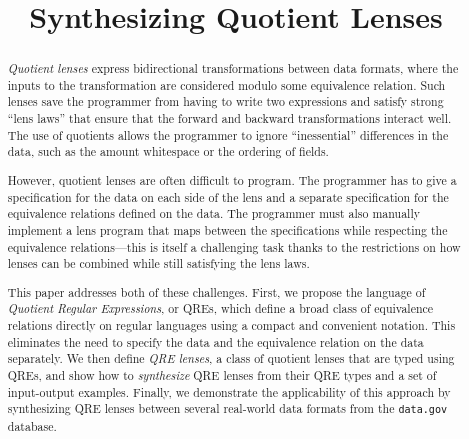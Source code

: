 \documentclass{svproc}
\begin{document}
\mainmatter              %
%
\title{Synthesizing Quotient Lenses}
%
%
\author{}
%
\authorrunning{} %
%
\tocauthor{}
%
\institute{}

\maketitle              %

\begin{abstract} 

  {\em Quotient lenses} express bidirectional transformations between data
  formats, where the inputs to the transformation are considered modulo some
  equivalence relation.  Such lenses save the programmer from having to write
  two expressions and satisfy strong ``lens laws'' that ensure that the forward
  and backward transformations interact well.  The use of quotients allows the
  programmer to ignore ``inessential'' differences in the data, such as the
  amount whitespace or the ordering of fields.

  However, quotient lenses are often difficult to program.  The programmer has
  to give a specification for the data on each side of the lens and a separate
  specification for the equivalence relations defined on the data. The
  programmer must also manually implement a lens program that maps between the
  specifications while respecting the equivalence relations---this is itself a
  challenging task thanks to the restrictions on how lenses can be combined
  while still satisfying the lens laws.

This paper addresses both of these challenges. First, we propose the
language of {\em Quotient Regular Expressions}, or QREs, which 
define a broad class of equivalence relations
directly on regular languages using a compact and convenient notation. This
eliminates the need to specify the data and the equivalence relation on the data
separately. We then define {\em QRE lenses}, a class of quotient
lenses that are typed using QREs, and show how to {\em synthesize} QRE lenses
from their QRE types and a set of input-output examples. Finally, we
demonstrate the applicability of this approach by synthesizing QRE lenses
between several real-world data formats from the {\tt data.gov} database.
\end{abstract}
\end{document}
